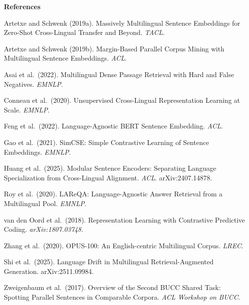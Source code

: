 \documentclass[11pt]{article}
\begin{document}
\medskip
\noindent\textbf{References}

\noindent Artetxe and Schwenk (2019a). Massively Multilingual Sentence Embeddings for
Zero-Shot Cross-Lingual Transfer and Beyond. \textit{TACL}.

\noindent Artetxe and Schwenk (2019b). Margin-Based Parallel Corpus Mining with
Multilingual Sentence Embeddings. \textit{ACL}.

\noindent Asai et al.\ (2022). Multilingual Dense Passage Retrieval with Hard and False
Negatives. \textit{EMNLP}.

\noindent Conneau et al.\ (2020). Unsupervised Cross-Lingual Representation Learning at
Scale. \textit{EMNLP}.

\noindent Feng et al.\ (2022). Language-Agnostic BERT Sentence Embedding. \textit{ACL}.

\noindent Gao et al.\ (2021). SimCSE: Simple Contrastive Learning of Sentence
Embeddings. \textit{EMNLP}.

\noindent Huang et al.\ (2025). Modular Sentence Encoders: Separating Language
Specialization from Cross-Lingual Alignment. \textit{ACL}. arXiv:2407.14878.

\noindent Roy et al.\ (2020). LAReQA: Language-Agnostic Answer Retrieval from a
Multilingual Pool. \textit{EMNLP}.

\noindent van den Oord et al.\ (2018). Representation Learning with Contrastive Predictive
Coding. \textit{arXiv:1807.03748}.

\noindent Zhang et al.\ (2020). OPUS-100: An English-centric Multilingual Corpus.
\textit{LREC}.

\noindent Shi et al.\ (2025). Language Drift in Multilingual Retrieval-Augmented
Generation. arXiv:2511.09984.

\noindent Zweigenbaum et al.\ (2017). Overview of the Second BUCC Shared Task: Spotting
Parallel Sentences in Comparable Corpora. \textit{ACL Workshop on BUCC}.
\end{document}
